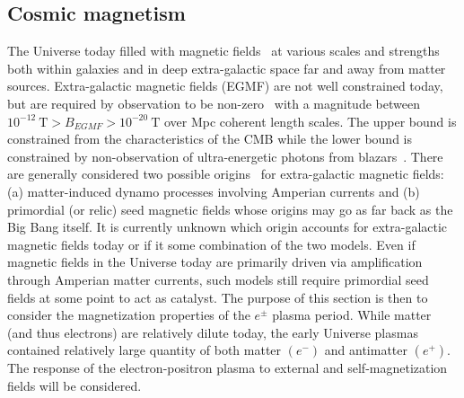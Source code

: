 \documentclass[universe,article,submit,moreauthors,pdftex,a4paper]{Definitions/mdpi}
\newcommand*{\xblue}{\color{blue}}
\begin{document}
\subsection{Cosmic magnetism}\label{sec:Energy}
\noindent The Universe today filled with magnetic fields~\cite{Kronberg:1993vk} at various scales and strengths both within galaxies and in deep extra-galactic space far and away from matter sources. Extra-galactic magnetic fields (EGMF) are not well constrained today, but are required by observation to be non-zero~\cite{Anchordoqui:2001bs,Widrow:2002ud} with a magnitude between $10^{-12}\ \mathrm{T}>B_{EGMF}>10^{-20}\ \mathrm{T}$ over Mpc coherent length scales. The upper bound is constrained from the characteristics of the CMB while the lower bound is constrained by non-observation of ultra-energetic photons from blazars~\cite{Neronov:2010gir}. There are generally considered two possible origins~\cite{Widrow:2011hs,Vazza:2021vwy} for extra-galactic magnetic fields: (a) matter-induced dynamo processes involving Amperian currents and (b) primordial (or relic) seed magnetic fields whose origins may go as far back as the Big Bang itself. It is currently unknown which origin accounts for extra-galactic magnetic fields today or if it some combination of the two models. Even if magnetic fields in the Universe today are primarily driven via amplification through Amperian matter currents, such models still require primordial seed fields at some point to act as catalyst. {\xblue The purpose of this section is then to consider the magnetization properties of the $e^{\pm}$ plasma period. While matter (and thus electrons) are relatively dilute today, the early Universe plasmas contained relatively large quantity of both matter $(e^-)$ and antimatter $(e^+)$. The response of the electron-positron plasma to external and self-magnetization fields will be considered.}
\end{document}
